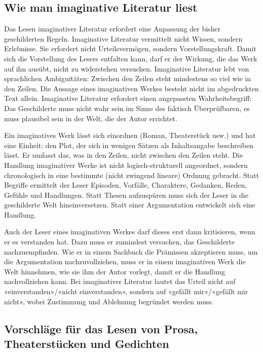 \documentclass[a4paper,12pt]{scrartcl}
\begin{document}
\subsection{Wie man imaginative Literatur liest}

Das Lesen imaginativer Literatur erfordert eine Anpassung der bisher geschilderten Regeln. Imaginative Literatur vermittelt nicht Wissen, sondern Erlebnisse. Sie erfordert nicht Urteilsvermögen, sondern Vorstellungskraft. Damit sich die Vorstellung des Lesers entfalten kann, darf er der Wirkung, die das Werk auf ihn ausübt, nicht zu widerstehen versuchen. Imaginative Literatur lebt von sprachlichen Ambiguitäten: Zwischen den Zeilen steht mindestens so viel wie in den Zeilen. Die Aussage eines imaginativen Werkes besteht nicht im abgedruckten Text allein. Imaginative Literatur erfordert einen angepassten Wahrheitsbegriff: Das Geschilderte muss nicht wahr sein im Sinne des faktisch Überprüfbaren, es muss plausibel sein in der Welt, die der Autor errichtet.

Ein imaginatives Werk lässt sich einordnen (Roman, Theaterstück usw.) und hat eine Einheit: den Plot, der sich in wenigen Sätzen als Inhaltsangabe beschreiben lässt. Er umfasst das, was in den Zeilen, nicht zwischen den Zeilen steht. Die Handlung imaginativer Werke ist nicht logisch-strukturell angeordnet, sondern chronologisch in eine bestimmte (nicht zwingend lineare) Ordnung gebracht. Statt Begriffe ermittelt der Leser Episoden, Vorfälle, Charaktere, Gedanken, Reden, Gefühle und Handlungen. Statt Thesen aufzuspüren muss sich der Leser in die geschilderte Welt hineinversetzen. Statt einer Argumentation entwickelt sich eine Handlung.

Auch der Leser eines imaginativen Werkes darf dieses erst dann kritisieren, wenn er es verstanden hat. Dazu muss er zumindest versuchen, das Geschilderte nachzuempfinden. Wie er in einem Sachbuch die Prämissen akzeptieren muss, um die Argumentation nachzuvollziehen, muss er in einem imaginativen Werk die Welt hinnehmen, wie sie ihm der Autor vorlegt, damit er die Handlung nachvollziehen kann. Bei imaginativer Literatur lautet das Urteil nicht auf «einverstanden»/«nicht einverstanden», sondern auf «gefällt mir»/«gefällt mir nicht», wobei Zustimmung und Ablehnung begründet werden muss.

\subsection{Vorschläge für das Lesen von Prosa, Theaterstücken und Gedichten}
\end{document}

